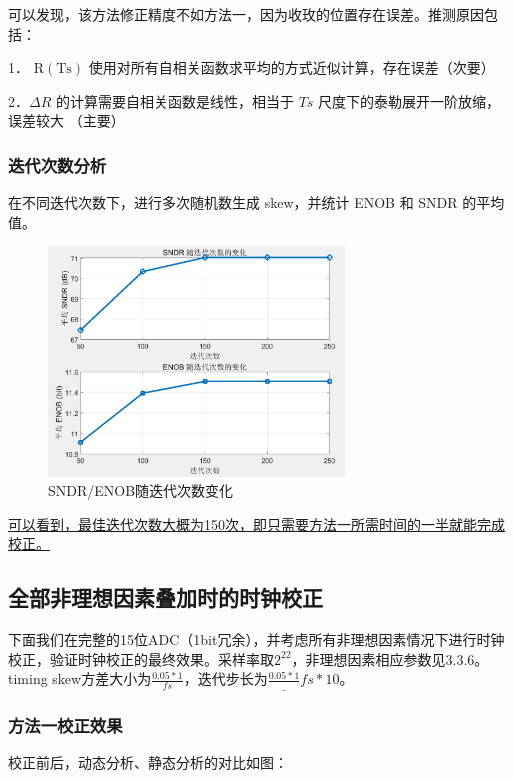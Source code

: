\documentclass[cs4size,a4paper]{ctexart}
\numberwithin{equation}{section}
\numberwithin{table}{section}
\numberwithin{figure}{section}
\begin{document}
		可以发现，该方法修正精度不如方法一，因为收玫的位置存在误差。推测原因包括：
		
		1． $\mathrm{R}(\mathrm{Ts})$ 使用对所有自相关函数求平均的方式近似计算，存在误差（次要）
		
		2．$\Delta R$ 的计算需要自相关函数是线性，相当于 $T s$ 尺度下的泰勒展开一阶放缩，误差较大 （主要）
			
		
		\subsubsection{迭代次数分析}
		在不同迭代次数下，进行多次随机数生成 skew，并统计 ENOB 和 SNDR 的平均值。
		
		\begin{figure}[H]
			\centering
			\includegraphics[width=0.7\textwidth]{figure/cor6.png}
			\caption{SNDR/ENOB随迭代次数变化} 
			\label{fig:cor6}
		\end{figure}
		
		\underline{可以看到，最佳迭代次数大概为150次，即只需要方法一所需时间的一半就能完成校正。}

		\subsection{全部非理想因素叠加时的时钟校正}

		下面我们在完整的15位ADC（1bit冗余），并考虑所有非理想因素情况下进行时钟校正，验证时钟校正的最终效果。采样率取$2^22$，非理想因素相应参数见3.3.6。timing skew方差大小为$\frac{0.05*1}{fs}$，迭代步长为$\frac{0.05*1}_{fs*10}$。

		\subsubsection{方法一校正效果}

		校正前后，动态分析、静态分析的对比如图：
\end{document}
